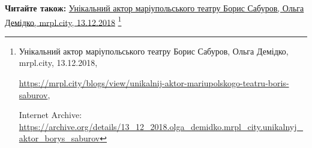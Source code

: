  
 
 
 
 

\textbf{Читайте також:} \href{https://archive.org/details/13_12_2018.olga_demidko.mrpl_city.unikalnyj_aktor_borys_saburov}{%
Унікальний актор маріупольського театру Борис Сабуров, Ольга Демідко, mrpl.city, 13.12.2018}%
\footnote{Унікальний актор маріупольського театру Борис Сабуров, Ольга Демідко, mrpl.city, 13.12.2018, \par\url{https://mrpl.city/blogs/view/unikalnij-aktor-mariupolskogo-teatru-boris-saburov}, \par Internet Archive: \url{https://archive.org/details/13_12_2018.olga_demidko.mrpl_city.unikalnyj_aktor_borys_saburov}}
